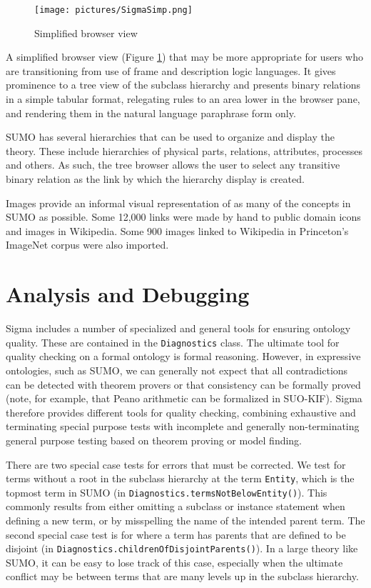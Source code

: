 \documentclass{book}
\begin{document}
\begin{figure}
  \centering
  \texttt{[image: pictures/SigmaSimp.png]}
  \caption{Simplified browser view}
  \label{fig:SigmaSimp}
\end{figure}

A simplified browser view (Figure \ref{fig:SigmaSimp}) that may
be more appropriate for users who are transitioning from use of frame and
description logic languages.  It gives prominence to a
tree view of the subclass hierarchy and presents binary relations in a simple
tabular format, relegating rules to an area lower in the browser pane, and
rendering them in the natural language paraphrase form only.

SUMO has several hierarchies that can be used to organize and display the
theory.  These include hierarchies of physical parts, relations, attributes,
processes and others.  As such, the tree browser allows the user to select any
transitive binary relation as the link by
which the hierarchy display is created.

Images provide an informal visual representation of as many of the concepts in
SUMO as possible.  Some 12,000 links were made by hand to public domain icons
and images in Wikipedia.  Some 900 images linked to Wikipedia in
Princeton's ImageNet \cite{deng2009} corpus were also imported.

\section{Analysis and Debugging}
\label{chap:KnowEngi:sec:Anal}

Sigma includes a number of specialized and general tools for ensuring ontology
quality. These are contained in the
\texttt{Diagnostics} class. The ultimate tool for
quality checking on a formal ontology is formal reasoning.  However, in
expressive ontologies, such as SUMO, we can generally not expect that all
contradictions can be detected with theorem provers or that
consistency can be formally proved (note, for example, that Peano arithmetic can
be formalized in SUO-KIF). Sigma
therefore provides different tools for quality checking, combining exhaustive
and terminating special purpose tests with incomplete and generally
non-terminating general purpose testing based on theorem proving or model
finding.

There are two special case tests for errors that must be corrected.  We test for
terms without a root in the subclass hierarchy at the term {\tt Entity}, which
is the topmost term in SUMO (in \texttt{Diagnostics.termsNotBelowEntity()}).
This commonly results from either omitting a subclass or instance statement when
defining a new term, or by misspelling the name of the intended parent term. The
second special case test is for where a term has parents that are defined to be
disjoint (in \texttt{Diagnostics.childrenOfDisjointParents()}).  In a large
theory like SUMO, it can be easy to lose track of this case, especially when the
ultimate conflict may be between terms that are many levels up in the subclass
hierarchy.
\end{document}
